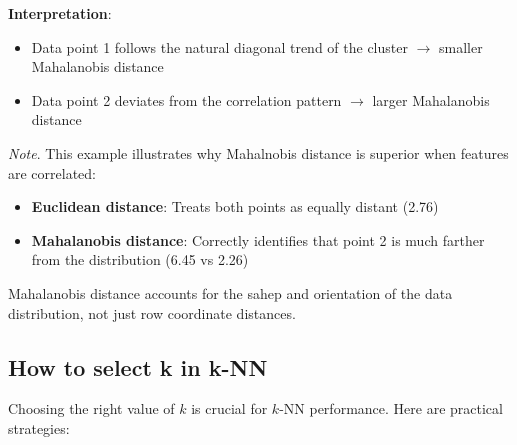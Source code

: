 \documentclass[a4paper]{article}
\theoremstyle{definition}
\begin{document}
\textbf{Interpretation}:
\begin{itemize}
    \item Data point 1 follows the natural diagonal trend of the cluster \( \rightarrow \) smaller Mahalanobis distance 
    \item Data point 2 deviates from the correlation pattern \( \rightarrow \) larger Mahalanobis distance
\end{itemize}
\textit{Note}. This example illustrates why Mahalnobis distance is superior when features are correlated:
\begin{itemize}
    \item \textbf{Euclidean distance}: Treats both points as equally distant (2.76)
    \item \textbf{Mahalanobis distance}: Correctly identifies that point 2 is much farther from the distribution (6.45 vs 2.26)
\end{itemize}
Mahalanobis distance accounts for the sahep and orientation of the data distribution, not just row coordinate distances.
\subsection{How to select k in k-NN}
Choosing the right value of \( k \) is crucial for \( k \)-NN performance. Here are practical strategies:
\end{document}
